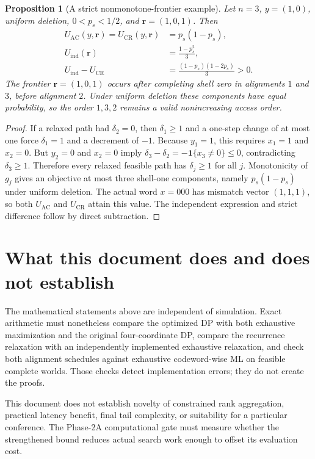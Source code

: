 \documentclass[11pt]{article}
\newtheorem{proposition}[theorem]{Proposition}
\theoremstyle{remark}
\newcommand{\ind}{\mathbf 1}
\begin{document}
\begin{proposition}[A strict nonmonotone-frontier example]
Let $n=3$, $y=(1,0)$, uniform deletion, $0<p_s<1/2$, and
$\mathbf r=(1,0,1)$. Then
\begin{align*}
 U_{\mathrm{AC}}(y,\mathbf r)=U_{\mathrm{CR}}(y,\mathbf r)&=p_s(1-p_s),\\
 U_{\mathrm{ind}}(\mathbf r)&=\frac{1-p_s^2}{3},\\
 U_{\mathrm{ind}}-U_{\mathrm{CR}}&=\frac{(1-p_s)(1-2p_s)}{3}>0.
\end{align*}
The frontier $\mathbf r=(1,0,1)$ occurs after completing shell zero in alignments
$1$ and $3$, before alignment $2$. Under uniform deletion these components have equal
probability, so the order $1,3,2$ remains a valid nonincreasing access order.
\end{proposition}

\begin{proof}
If a relaxed path had $\delta_2=0$, then $\delta_1\ge1$ and a one-step change of at most
one force $\delta_1=1$ and a decrement of $-1$. Because $y_1=1$, this requires
$x_1=1$ and $x_2=0$. But $y_2=0$ and $x_2=0$ imply
$\delta_3-\delta_2=-\ind\{x_3\ne0\}\le0$, contradicting $\delta_3\ge1$.
Therefore every relaxed feasible path has $\delta_j\ge1$ for all $j$. Monotonicity of
$g_j$ gives an objective at most three shell-one components, namely $p_s(1-p_s)$ under
uniform deletion. The actual word $x=000$ has mismatch vector $(1,1,1)$, so both
$U_{\mathrm{AC}}$ and $U_{\mathrm{CR}}$ attain this value. The independent expression
and strict difference follow by direct subtraction.
\end{proof}


\section{What this document does and does not establish}

The mathematical statements above are independent of simulation. Exact arithmetic must
nonetheless compare the optimized DP with both exhaustive maximization and the original
four-coordinate DP, compare the recurrence relaxation with an independently implemented
exhaustive relaxation, and check both alignment schedules against exhaustive codeword-wise
ML on feasible complete worlds. Those checks detect implementation errors;
they do not create the proofs.

This document does not establish novelty of constrained rank aggregation, practical
latency benefit, final tail complexity, or suitability for a particular conference. The
Phase-2A computational gate must measure whether the strengthened bound reduces actual
search work enough to offset its evaluation cost.
\end{document}
